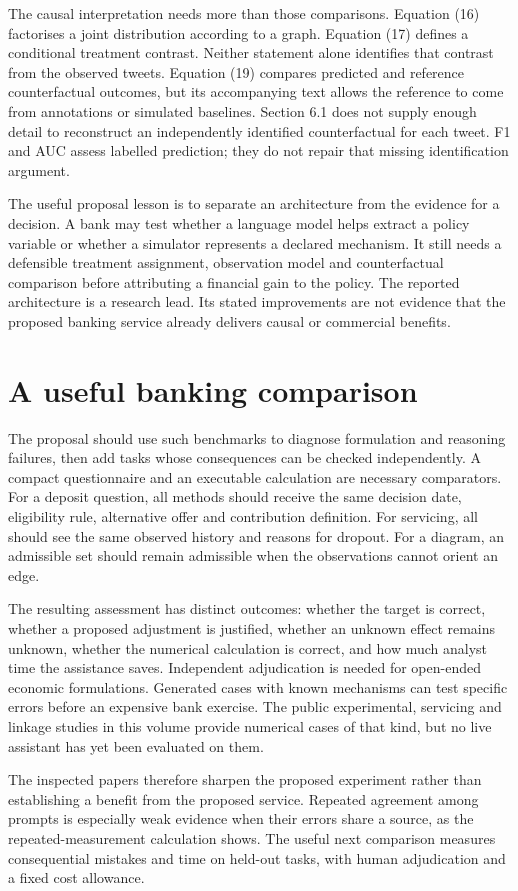 The causal interpretation needs more than those comparisons. Equation (16)
factorises a joint distribution according to a graph. Equation (17) defines
a conditional treatment contrast. Neither statement alone identifies that
contrast from the observed tweets. Equation (19) compares predicted and
reference counterfactual outcomes, but its accompanying text allows the
reference to come from annotations or simulated baselines. Section 6.1 does
not supply enough detail to reconstruct an independently identified
counterfactual for each tweet. F1 and AUC assess labelled prediction; they
do not repair that missing identification argument.

The useful proposal lesson is to separate an architecture from the evidence
for a decision. A bank may test whether a language model helps extract a
policy variable or whether a simulator represents a declared mechanism.
It still needs a defensible treatment assignment, observation model and
counterfactual comparison before attributing a financial gain to the policy.
The reported architecture is a research lead. Its stated improvements are
not evidence that the proposed banking service already delivers causal or
commercial benefits.

\section{A useful banking comparison}
The proposal should use such benchmarks to diagnose formulation and reasoning
failures, then add tasks whose consequences can be checked independently.
A compact questionnaire and an executable calculation are necessary
comparators. For a deposit question, all methods should receive the same
decision date, eligibility rule, alternative offer and contribution definition.
For servicing, all should see the same observed history and reasons for
dropout. For a diagram, an admissible set should remain admissible when the
observations cannot orient an edge.

The resulting assessment has distinct outcomes: whether the target is correct,
whether a proposed adjustment is justified, whether an unknown effect remains
unknown, whether the numerical calculation is correct, and how much analyst
time the assistance saves. Independent adjudication is needed for open-ended
economic formulations. Generated cases with known mechanisms can test
specific errors before an expensive bank exercise. The public experimental,
servicing and linkage studies in this volume provide numerical cases of that
kind, but no live assistant has yet been evaluated on them.

The inspected papers therefore sharpen the proposed experiment rather
than establishing a benefit from the proposed service. Repeated agreement
among prompts is especially weak evidence when their errors share a source,
as the repeated-measurement calculation shows. The useful next comparison
measures consequential mistakes and time on held-out tasks, with human
adjudication and a fixed cost allowance.
